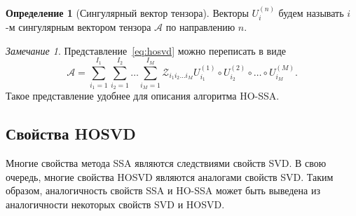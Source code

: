 \documentclass[specialist,
    substylefile = spbu.rtx,
    subf,href,colorlinks=true, 12pt]{disser}
\theoremstyle{plain}
\theoremstyle{definition}
\newtheorem{definition}{Определение}[section]
\theoremstyle{remark}
\newtheorem*{remark}{Замечание}
\begin{document}
    \begin{definition}[Сингулярный вектор тензора]
        \label{def:singular-tensor}
        Векторы $U_i^{(n)}$ будем называть $i$-м сингулярным вектором тензора $\mathcal A$ по направлению $n$.
    \end{definition}
    \begin{remark}
        Представление~\eqref{eq:hosvd} можно переписать в виде
        \begin{equation}
            \mathcal{A}=\sum_{i_1=1}^{I_1} \sum_{i_2=1}^{I_2}\ldots \sum_{i_M=1}^{I_M} \mathcal{Z}_{i_1 i_2 \ldots i_M}
            U^{(1)}_{i_1} \circ U^{(2)}_{i_2} \circ \ldots\circ U^{(M)}_{i_M}.\label{eq:sum-hosvd}
        \end{equation}
        Такое представление удобнее для описания алгоритма HO-SSA\@.
    \end{remark}
    

    \subsection{Свойства HOSVD}\label{subsec:hosvd-properties}
    Многие свойства метода SSA являются следствиями свойств SVD\@.
    В свою очередь, многие свойства HOSVD являются аналогами свойств SVD\@.
    Таким образом, аналогичность свойств SSA и HO-SSA может быть выведена из аналогичности некоторых свойств SVD и HOSVD\@.
\end{document}
